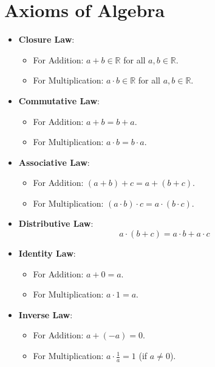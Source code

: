 \documentclass{article}
\begin{document}
\section*{Axioms of Algebra}

\begin{itemize}
    \item \textbf{Closure Law}:
        \begin{itemize}
            \item For Addition: \( a + b \in \mathbb{R} \) for all \( a, b \in \mathbb{R} \).
            \item For Multiplication: \( a \cdot b \in \mathbb{R} \) for all \( a, b \in \mathbb{R} \).
        \end{itemize}
    \item \textbf{Commutative Law}:
        \begin{itemize}
            \item For Addition: \( a + b = b + a \).
            \item For Multiplication: \( a \cdot b = b \cdot a \).
        \end{itemize}
    \item \textbf{Associative Law}:
        \begin{itemize}
            \item For Addition: \( (a + b) + c = a + (b + c) \).
            \item For Multiplication: \( (a \cdot b) \cdot c = a \cdot (b \cdot c) \).
        \end{itemize}
    \item \textbf{Distributive Law}:
        \[
        a \cdot (b + c) = a \cdot b + a \cdot c
        \]
    \item \textbf{Identity Law}:
        \begin{itemize}
            \item For Addition: \( a + 0 = a \).
            \item For Multiplication: \( a \cdot 1 = a \).
        \end{itemize}
    \item \textbf{Inverse Law}:
        \begin{itemize}
            \item For Addition: \( a + (-a) = 0 \).
            \item For Multiplication: \( a \cdot \frac{1}{a} = 1 \) (if \( a \neq 0 \)).
        \end{itemize}
\end{itemize}
\end{document}
